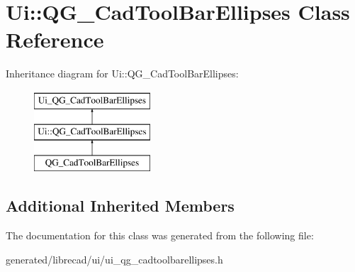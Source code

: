 \hypertarget{classUi_1_1QG__CadToolBarEllipses}{\section{Ui\-:\-:Q\-G\-\_\-\-Cad\-Tool\-Bar\-Ellipses Class Reference}
\label{classUi_1_1QG__CadToolBarEllipses}
}
Inheritance diagram for Ui\-:\-:Q\-G\-\_\-\-Cad\-Tool\-Bar\-Ellipses\-:\begin{figure}[H]
\begin{center}
\leavevmode
\includegraphics[height=3.000000cm]{classUi_1_1QG__CadToolBarEllipses}
\end{center}
\end{figure}
\subsection*{Additional Inherited Members}


The documentation for this class was generated from the following file\-:\begin{DoxyCompactItemize}
\item 
generated/librecad/ui/ui\-\_\-qg\-\_\-cadtoolbarellipses.\-h\end{DoxyCompactItemize}
